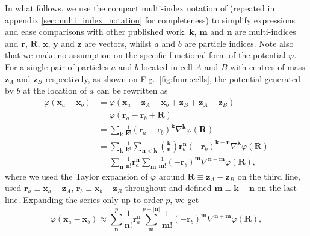 In what follows, we use the compact multi-index notation of
\cite{Dehnen2014} (repeated in appendix \ref{sec:multi_index_notation}
for completeness) to simplify expressions and ease comparisons with
other published work. $\mathbf{k}$, $\mathbf{m}$ and $\mathbf{n}$ are
multi-indices and $\mathbf{r}$, $\mathbf{R}$, $\mathbf{x}$,
$\mathbf{y}$ and $\mathbf{z}$ are vectors, whilst $a$ and $b$ are
particle indices. Note also that we make no assumption on the specific
functional form of the potential $\varphi$.\\
For a single pair of particles $a$ and $b$ located in cell $A$ and $B$
with centres of mass $\mathbf{z}_A$ and $\mathbf{z}_B$ respectively,
as shown on Fig.~\ref{fig:fmm:cells}, the potential generated by $b$
at the location of $a$ can be rewritten as
\begin{align}
  \varphi(\mathbf{x}_a - \mathbf{x}_b)
  &= \varphi\left(\mathbf{x}_a - \mathbf{z}_A - \mathbf{x}_b +
  \mathbf{z}_B + \mathbf{z}_A - \mathbf{z}_B\right)  \nonumber \\
  &= \varphi\left(\mathbf{r}_a - \mathbf{r}_b + \mathbf{R}\right)
  \nonumber \\
  &= \sum_\mathbf{k} \frac{1}{\mathbf{k}!} \left(\mathbf{r}_a -
  \mathbf{r}_b\right)^{\mathbf{k}} \nabla^{\mathbf{k}}\varphi(\mathbf{R})
  \nonumber \\
  &= \sum_\mathbf{k} \frac{1}{\mathbf{k}!} \sum_{\mathbf{n} <
    \mathbf{k}} \binom{\mathbf{k}}{\mathbf{n}} \mathbf{r}_a^{\mathbf{n}}
  \left(-\mathbf{r}_b\right)^{\mathbf{k} - \mathbf{n}}
  \nabla^{\mathbf{k}}\varphi(\mathbf{R})\nonumber \\
  &= \sum_\mathbf{n} \frac{1}{\mathbf{n}!} \mathbf{r}_a^{\mathbf{n}}
  \sum_\mathbf{m} \frac{1}{\mathbf{m}!}
  \left(-\mathbf{r}_b\right)^\mathbf{m} \nabla^{\mathbf{n}+\mathbf{m}} \varphi(\mathbf{R}),
  \label{eq:fmm:expansion}
\end{align}
where we used the Taylor expansion of $\varphi$ around $\mathbf{R} \equiv
\mathbf{z}_A - \mathbf{z}_B$ on the third line, used $\mathbf{r}_a
\equiv \mathbf{x}_a - \mathbf{z}_A$, $\mathbf{r}_b \equiv \mathbf{x}_b
- \mathbf{z}_B$ throughout and defined $\mathbf{m} \equiv
\mathbf{k}-\mathbf{n}$ on the last line. Expanding the series only up
to order $p$, we get
\begin{equation}
  \varphi(\mathbf{x}_a - \mathbf{x}_b) \approx \sum_{\mathbf{n}}^{p}
  \frac{1}{\mathbf{n}!} \mathbf{r}_a^{\mathbf{n}} \sum_{\mathbf{m}}^{p
    -|\mathbf{n}|} 
  \frac{1}{\mathbf{m}!} \left(-\mathbf{r}_b\right)^\mathbf{m}
  \nabla^{\mathbf{n}+\mathbf{m}} \varphi(\mathbf{R}),
  \label{eq:fmm:fmm_one_part}
\end{equation}
